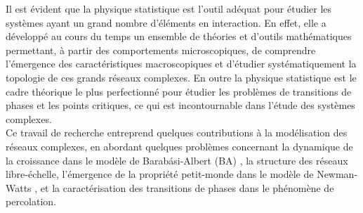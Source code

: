 Il est évident que la physique statistique est l'outil adéquat pour étudier les systèmes ayant un grand nombre d'éléments en interaction. En effet, elle a développé au cours du temps un ensemble de théories et d'outils mathématiques permettant, à partir des comportements microscopiques, de comprendre l'émergence des caractéristiques macroscopiques et d’étudier systématiquement la topologie de ces grands réseaux complexes. En outre la physique statistique est le cadre théorique le plus perfectionné pour étudier les problèmes de transitions de phases et les points critiques, ce qui est incontournable dans l'étude des systèmes complexes. \\

Ce travail de recherche entreprend quelques contributions à la modélisation des réseaux complexes, en abordant quelques problèmes concernant la dynamique de la croissance dans le modèle de Barabási-Albert (BA) \cite{BA1999}, la structure des réseaux  libre-échelle, l'émergence de la propriété petit-monde dans le modèle de Newman-Watts \cite{Newman-Watts1999-2}, et la caractérisation des transitions de phases dans le phénomène de  percolation.
